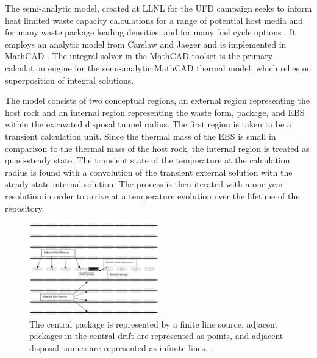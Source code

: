 The semi-analytic model, created at \gls{LLNL} for the \gls{UFD} campaign seeks to 
inform heat limited waste capacity calculations for a range of potential host 
media and for many 
waste package loading densities, and for many fuel cycle options 
\cite{hardin_generic_2011, greenberg_investigations_2012, 
greenberg_application_2012}. It employs an analytic model from Carslaw and 
Jaeger and is implemented in MathCAD \cite{carslaw_conduction_1959, 
ptc_mathcad_2010}.  The integral solver in the MathCAD toolset is the primary 
calculation engine for the semi-analytic MathCAD thermal model, which relies on 
superposition of integral solutions.  


The model consists of two conceptual regions, an external region representing 
the host rock and an internal region representing the waste form, package, and 
\gls{EBS} within the excavated disposal tunnel radius. The first region is taken to be  
a transient calculation unit.  Since the thermal mass of the \gls{EBS} is small 
in comparison to the thermal mass of the host rock, the internal region is   
treated as quasi-steady state. The transient state of the temperature at the 
calculation radius is found with a convolution of the transient external 
solution with the steady state internal solution.  The process is then iterated 
with a one year resolution in order to arrive at a temperature evolution over 
the lifetime of the repository. 

\begin{figure}[h!]
  \begin{center}
    \includegraphics[width=0.5\textwidth]{./chapters/litrev/llnlConcept.eps}
  \end{center}
  \caption[LLNL semi-analytic thermal model geometry]{The central package is represented by a finite line source, adjacent 
  packages in the central drift are represented as points, and adjacent disposal 
  tunnes are represented as infinite lines.
  \cite{greenberg_investigations_2012}.}
  \label{fig:llnl}
\end{figure}

